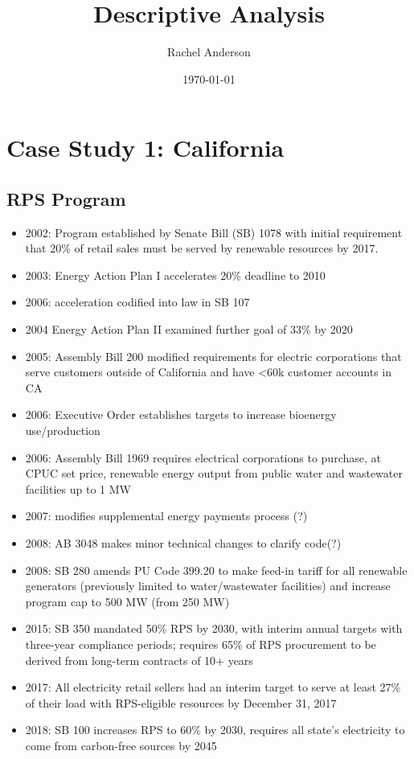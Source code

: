 \documentclass[11pt, oneside]{article}   	%
\title{Descriptive Analysis}
\author{Rachel Anderson}
\date{\today}							%
\begin{document}
\maketitle

\section{Case Study 1: California}

\subsection{RPS Program}
\begin{itemize}
\item 2002:  Program established by Senate Bill (SB) 1078 with initial requirement that 20\% of retail sales must be served by renewable resources by 2017.  
\item 2003: Energy Action Plan I accelerates 20\% deadline to 2010
\item 2006: acceleration codified into law in SB 107
\item 2004 Energy Action Plan II examined further goal of 33\% by 2020
\item 2005: Assembly Bill 200 modified requirements for electric corporations that serve customers outside of California and have <60k customer accounts in CA 
\item 2006: Executive Order establishes targets to increase bioenergy use/production
\item 2006: Assembly Bill 1969 requires electrical corporations to purchase, at CPUC set price, renewable energy output from public water and wastewater facilities up to 1 MW
\item 2007: modifies supplemental energy payments process (?)
\item 2008: AB 3048 makes minor technical changes to clarify code(?)
\item 2008: SB 280 amends PU Code 399.20 to make feed-in tariff for all renewable generators (previously limited to water/wastewater facilities) and increase program cap to 500 MW (from 250 MW) 
\item 2015: SB 350 mandated 50\% RPS by 2030, with interim annual targets with three-year compliance periods; requires 65\% of RPS procurement to be derived from long-term contracts of 10+ years
\item 2017: All electricity retail sellers had an interim target to serve at least 27\% of their load with RPS-eligible resources by December 31, 2017
\item 2018: SB 100 increases RPS to 60\% by 2030, requires all state's electricity to come from carbon-free sources by 2045
\end{itemize}
\end{document}
